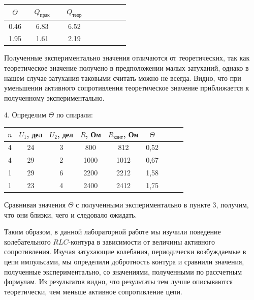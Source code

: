 \documentclass[14pt]{article}
\begin{document}
\begin{center}
\begin{tabular}{|c|c|c|c|c|c|c|c|}
\hline
$~~~\Theta~~~$	&	$~~~Q_{\text{прак}}~~~$	&	$~~~Q_{\text{теор}}~~~$		\\
\hline
0.46			&	6.83					&	6.52						\\
\hline
1.95			&	1.61					&	2.19						\\
\hline
\end{tabular}
\end{center}

Полученные экспериментально значения отличаются от теоретических, так как теоретическое значение получено в предположении малых затуханий, однако в нашем случае затухания таковыми считать можно не всегда. Видно, что при уменьшении активного сопротивления теоретическое значение приближается к полученному экспериментально.

\vspace{1cm}
4. Определим $\Theta$ по спирали:

\begin{center}
\begin{tabular}{|c|c|c|c|c|c|c|c|c|}
\hline
$n$&$U_1$, дел&$U_2$, дел&$R$, Ом&$R_{\text{конт}}$, Ом	&$\Theta$	\\
\hline
4&24&3&800&812&0,52\\
\hline
4&29&2&1000&1012&0,67\\
\hline
1&29&6&2200&2212&1,58\\
\hline
1&23&4&2400&2412&1,75\\
\hline
\end{tabular}
\end{center}

Сравнивая значения $\Theta$ с полученными экспериментально в пункте 3, получим, что они близки, чего и следовало ожидать.

\vspace{1cm}
Таким образом, в данной лабораторной работе мы изучили поведение колебательного $RLC$-контура в зависимости от величины активного сопротивления. Изучая затухающие колебания, периодически возбуждаемые в цепи импульсами, мы определили добротность контура и сравнили значения, полученные экспериментально, со значениями, полученными по рассчетным формулам. Из результатов видно, что результаты тем лучше описываются теоретически, чем меньше активное сопротивление цепи.
\end{document}
